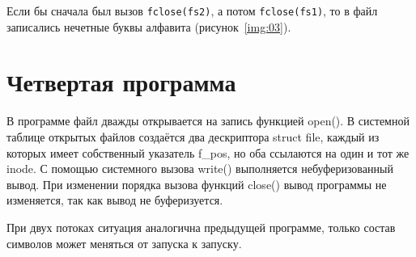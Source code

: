 Если бы сначала был вызов \texttt{fclose(fs2)}, а потом \texttt{fclose(fs1)},
то в файл записались нечетные буквы алфавита (рисунок~\ref{img:03}).





\section{Четвертая программа}

\vspace{-0.5cm}


В программе файл дважды открывается на запись функцией open(). В системной 
таблице открытых файлов создаётся два дескриптора struct file, каждый из которых 
имеет собственный указатель f\_pos, но оба ссылаются на один
и тот же inode. С помощью системного вызова write() выполняется небуферизованный 
вывод. При изменении порядка вызова функций close() вывод программы не 
изменяется, так как вывод не буферизуется.

\clearpage
{}
При двух потоках ситуация аналогична предыдущей программе, только состав символов может меняться от запуска к запуску.


